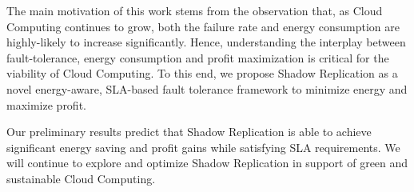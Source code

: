 The main motivation of this work stems from the observation that, as Cloud Computing continues to grow, both the failure rate and energy consumption are highly-likely to increase significantly. Hence, understanding the interplay between fault-tolerance, energy consumption and profit maximization is critical for the viability of Cloud Computing. To this end, we propose Shadow Replication as a novel energy-aware, SLA-based fault tolerance framework to minimize energy and maximize profit.


Our preliminary results predict that Shadow Replication is able to achieve significant energy saving and profit gains while satisfying SLA requirements. We will continue to explore and optimize Shadow Replication in support of green and sustainable Cloud Computing.
